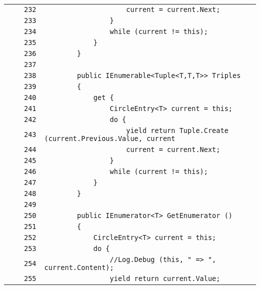 \documentclass[a4paper,10pt]{article}
\begin{document}
\begin{longtable}[l]{lrrl}
\cellcolor{gray} &  & \verb~232~ & \verb~                    current = current.Next;~\\
\cellcolor{gray} &  & \verb~233~ & \verb~                }~\\
\cellcolor{gray} &  & \verb~234~ & \verb~                while (current != this);~\\
\cellcolor{gray} &  & \verb~235~ & \verb~            }~\\
\cellcolor{gray} &  & \verb~236~ & \verb~        }~\\
\cellcolor{gray} &  & \verb~237~ & \verb~~\\
\cellcolor{gray} &  & \verb~238~ & \verb~        public IEnumerable<Tuple<T,T,T>> Triples~\\
\cellcolor{gray} &  & \verb~239~ & \verb~        {~\\
\cellcolor{gray} &  & \verb~240~ & \verb~            get {~\\
\cellcolor{gray} &  & \verb~241~ & \verb~                CircleEntry<T> current = this;~\\
\cellcolor{gray} &  & \verb~242~ & \verb~                do {~\\
\cellcolor{gray} &  & \verb~243~ & \verb~                    yield return Tuple.Create (current.Previous.Value, current~\\
\cellcolor{gray} &  & \verb~244~ & \verb~                    current = current.Next;~\\
\cellcolor{gray} &  & \verb~245~ & \verb~                }~\\
\cellcolor{gray} &  & \verb~246~ & \verb~                while (current != this);~\\
\cellcolor{gray} &  & \verb~247~ & \verb~            }~\\
\cellcolor{gray} &  & \verb~248~ & \verb~        }~\\
\cellcolor{gray} &  & \verb~249~ & \verb~~\\
\cellcolor{gray} &  & \verb~250~ & \verb~        public IEnumerator<T> GetEnumerator ()~\\
\cellcolor{gray} &  & \verb~251~ & \verb~        {~\\
\cellcolor{gray} &  & \verb~252~ & \verb~            CircleEntry<T> current = this;~\\
\cellcolor{gray} &  & \verb~253~ & \verb~            do {~\\
\cellcolor{gray} &  & \verb~254~ & \verb~                //Log.Debug (this, " => ", current.Content);~\\
\cellcolor{gray} &  & \verb~255~ & \verb~                yield return current.Value;~\\

\end{longtable}
\end{document}
